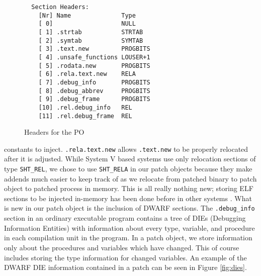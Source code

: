 \begin{figure}[ht]
\begin{center}
\begin{verbatim}
  Section Headers:
    [Nr] Name              Type          
    [ 0]                   NULL          
    [ 1] .strtab           STRTAB        
    [ 2] .symtab           SYMTAB        
    [ 3] .text.new         PROGBITS      
    [ 4] .unsafe_functions LOUSER+1
    [ 5] .rodata.new       PROGBITS      
    [ 6] .rela.text.new    RELA          
    [ 7] .debug_info       PROGBITS      
    [ 8] .debug_abbrev     PROGBITS      
    [ 9] .debug_frame      PROGBITS      
    [10] .rel.debug_info   REL           
    [11] .rel.debug_frame  REL           
\end{verbatim}
\end{center}
\caption{Headers for the PO}
\label{fig:elfheaders}
\end{figure}
constants to inject. \texttt{.rela.text.new} allows \texttt{.text.new}
to be properly relocated after it is adjusted. While System V based
systems use only relocation sections of type \texttt{SHT\_REL}, we
chose to use \texttt{SHT\_RELA} in our patch objects because they make
addends much easier to keep track of as we relocate from patched
binary to patch object to patched process in memory. This is all
really nothing new; storing ELF sections to be injected in-memory has
been done before in other systems \cite{eresi}. What is new in our patch object is
the inclusion of DWARF sections. The \texttt{.debug\_info} section in
an ordinary executable program contains a tree of DIEs (Debugging
Information Entities) with information about every type, variable, and
procedure in each compilation unit in the program. In a patch object,
we store information only about the procedures and variables which
have changed. This of course includes storing the type information for
changed variables. An example of the DWARF DIE information contained
in a patch can be seen in Figure \ref{fig:dies}.

